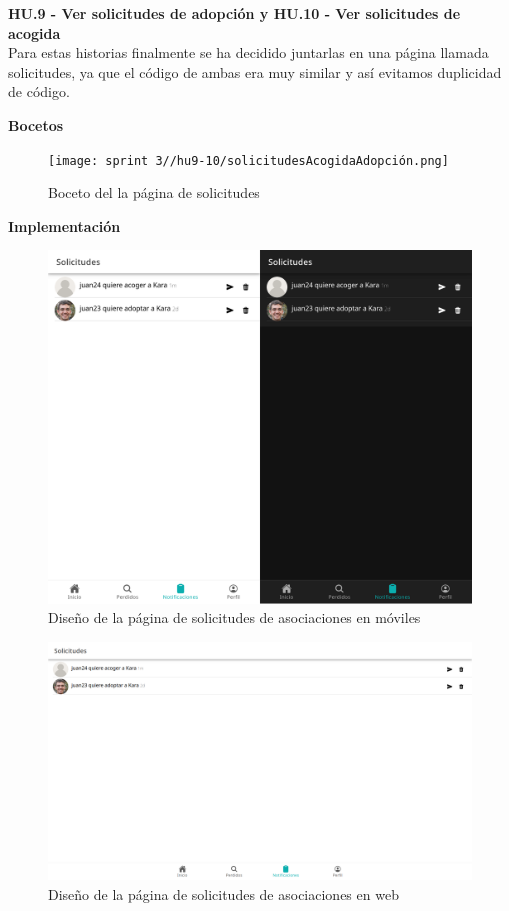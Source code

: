 \Large{\textbf{HU.9 - Ver solicitudes de adopción y HU.10 - Ver solicitudes de acogida}} \\

Para estas historias finalmente se ha decidido juntarlas en una página llamada solicitudes, ya que el código de ambas era muy similar y así evitamos duplicidad de código.

\textbf{Bocetos}
\begin{figure}[H]
	\centering
	\texttt{[image: sprint 3//hu9-10/solicitudesAcogidaAdopción.png]}
	\caption{Boceto del la página de solicitudes}
	\label{fig:boceto_adopt}
\end{figure}


\textbf{Implementación}

\begin{figure} [H]
	\centering
	\includegraphics[width=1\linewidth]{sprint 3//hu9-10/solicitudes.png}
	\caption{Diseño de la página de solicitudes de asociaciones en móviles}
\end{figure}

\begin{figure}[H]
	\centering
	\includegraphics[width=1\linewidth]{sprint 3//hu9-10/solicitudesWeb.png}
	\caption{Diseño de la página de solicitudes de asociaciones en web}
\end{figure}

